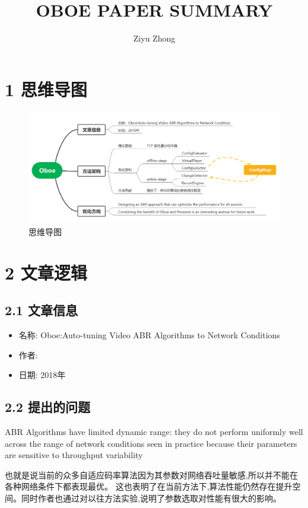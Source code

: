 \documentclass{\SetClass}
\title{OBOE PAPER SUMMARY}
\author{Ziyu Zhong}
\begin{document}
    \maketitle
    
    \section*{1 思维导图}
    \begin{figure}[!h]
        \centering
        \includegraphics[scale=0.6]{./Fig/mindmap-oboe.png}
        \caption{思维导图}
        \label{fig:1}
    \end{figure}

    \section*{2 文章逻辑}
    \subsection*{2.1 文章信息}
    \begin{itemize}
        \item 名称: Oboe:Auto-tuning Video ABR Algorithms to Network Conditions
        \item 作者: 
        \item 日期: 2018年 
    \end{itemize}
    \subsection*{2.2 提出的问题}
    \par ABR Algorithms have limited dynamic range: they do not perform uniformly well across the range
    of network conditions seen in practice because their parameters are sensitive to throughput variability
    \par 也就是说当前的众多自适应码率算法因为其参数对网络吞吐量敏感,所以并不能在各种网络条件下都表现最优。
    这也表明了在当前方法下,算法性能仍然存在提升空间。同时作者也通过对以往方法实验,说明了参数选取对性能有很大的影响。   
\end{document}
